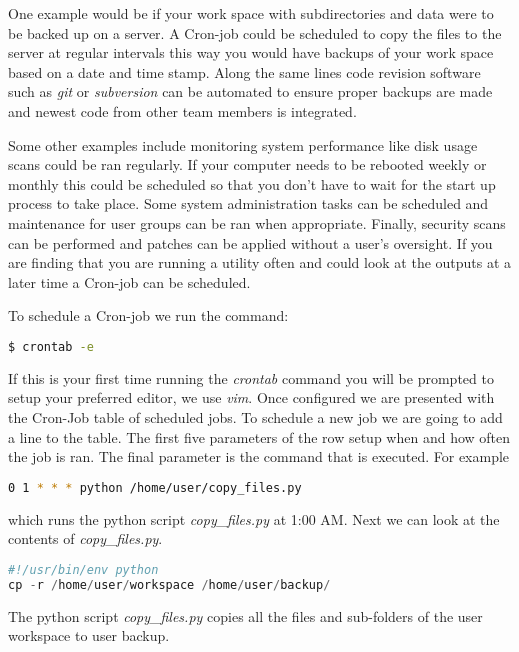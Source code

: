 One example would be if your work space with subdirectories and data were to be backed up on a server. A Cron-job could be scheduled to copy the files to the server at regular intervals this way you would have backups of your work space based on a date and time stamp. Along the same lines code revision software such as \emph{git} or \emph{subversion} can be automated to ensure proper backups are made and newest code from other team members is integrated.  

Some other examples include monitoring system performance like disk usage scans could be ran regularly. If your computer needs to be rebooted weekly or monthly this could be scheduled so that you don't have to wait for the start up process to take place. Some system administration tasks can be scheduled and maintenance for user groups can be ran when appropriate. Finally, security scans can be performed and patches can be applied without a user's oversight. If you are finding that you are running a utility often and could look at the outputs at a later time a Cron-job can be scheduled. 

To schedule a Cron-job we run the command:

\begin{lstlisting}[language=bash]
   $ crontab -e
\end{lstlisting}
	
If this is your first time running the \emph{crontab} command you will be prompted to setup your preferred editor, we use \emph{vim}. Once configured we are presented with the Cron-Job table of scheduled jobs. To schedule a new job we are going to add a line to the table. The first five parameters of the row setup when and how often the job is ran. The final parameter is the command that is executed. For example 

\begin{lstlisting}[language=bash]
    0 1 * * * python /home/user/copy_files.py
\end{lstlisting}

which runs the python script \emph{copy\_files.py} at 1:00 AM. Next we can look at the contents of \emph{copy\_files.py}. 

\begin{lstlisting}[language=python]
#!/usr/bin/env python
cp -r /home/user/workspace /home/user/backup/
\end{lstlisting}

The python script \emph{copy\_files.py} copies all the files and sub-folders of the user workspace to user backup. 
	
